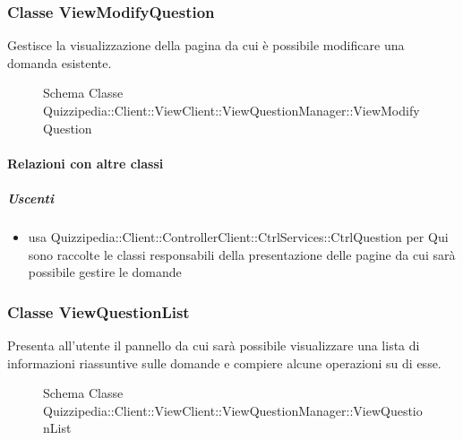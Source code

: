 \subsubsection{Classe ViewModifyQuestion}
Gestisce la visualizzazione della pagina da cui è possibile modificare una domanda esistente.
\begin{figure}[H]
\centering
\noindent{}
\caption[Schema Classe ViewModifyQuestion]{Schema Classe Quizzipedia::Client::ViewClient::ViewQuestionManager::ViewModifyQuestion}
\end{figure}
\paragraph{Relazioni con altre classi}
\subparagraph{Uscenti}
\begin{itemize}
\item usa Quizzipedia::Client::ControllerClient::CtrlServices::CtrlQuestion per Qui sono raccolte le classi responsabili della presentazione delle pagine da cui sarà possibile gestire le domande
\end{itemize}
\subsubsection{Classe ViewQuestionList}
Presenta all'utente il pannello da cui sarà possibile visualizzare una lista di informazioni riassuntive sulle domande e compiere alcune operazioni su di esse.
\begin{figure}[H]
\centering
\noindent{}
\caption[Schema Classe ViewQuestionList]{Schema Classe Quizzipedia::Client::ViewClient::ViewQuestionManager::ViewQuestionList}
\end{figure}
